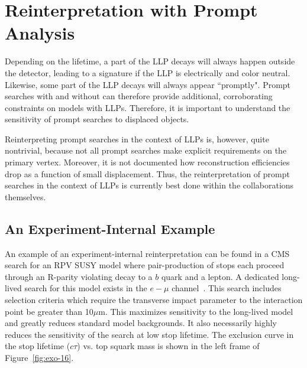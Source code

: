 
\section{Reinterpretation with Prompt Analysis}\label{sec:ch5-recastingPrompt}

Depending on the lifetime, a part of the LLP decays will always happen
outside the detector, leading to a \MET signature if the LLP is
electrically and color neutral. Likewise, some part of the LLP decays will always appear 
``promptly". Prompt searches with and without \MET can therefore provide
additional, corroborating constraints on models with LLPs. Therefore, it is
important to understand the sensitivity of prompt searches to displaced objects.

Reinterpreting prompt searches in the context of LLPs is, however,
quite nontrivial, because not all prompt searches make explicit
requirements on the primary vertex. Moreover, it is not documented how
reconstruction efficiencies drop as a function of small displacement.
Thus, the reinterpretation of prompt searches in the context of LLPs is
currently best done within the collaborations themselves. 

\subsection{An Experiment-Internal Example}

An example of an experiment-internal reinterpretation can be found in a CMS
search for an RPV SUSY model where pair-production of stops each proceed through
an R-parity violating decay to a $b$ quark and a lepton. A dedicated long-lived
search for this model exists in the $e-\mu$ channel~\cite{CMS-PAS-EXO-16-022}.
This search includes selection criteria which require the transverse impact
parameter to the interaction point be greater than 10$\mu$m. This maximizes
sensitivity to the long-lived model and greatly reduces standard model
backgrounds. It also necessarily highly reduces the sensitivity of the search at
low stop lifetime. The exclusion curve in the stop lifetime ($c\tau$) vs. top
squark mass is shown in the left frame of Figure~\ref{fig:exo-16}.


